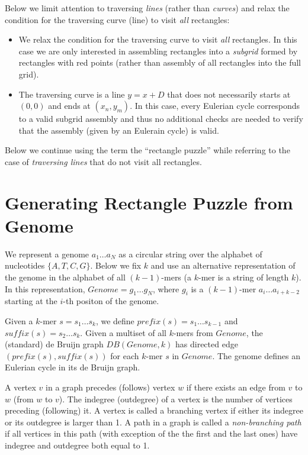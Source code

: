 \documentclass[a4paper]{article}
\begin{document}
Below we limit attention to traversing {\em lines} (rather than {\em curves})   and  relax the condition for the traversing curve (line) to visit  {\em all} rectangles: 
\begin{itemize} 
\item We relax the condition for the traversing curve to visit {\em all} rectangles.  In this case we are only interested in assembling  rectangles into a {\em subgrid}  formed by rectangles with red points (rather than assembly of all rectangles into the full grid). 
\item The traversing curve is a line $y=x+D$ that does not necessarily starts at $(0,0)$ and ends at $(x_n,y_m)$. In this case, every Eulerian cycle corresponds to a valid subgrid assembly and thus no additional checks are needed to verify that the assembly (given by an Eulerain cycle) is valid. 
\end{itemize}

Below we continue using the term the ``rectangle puzzle'' while referring to the case of \emph{traversing lines} that do not visit all rectangles. 

\section{Generating Rectangle Puzzle from Genome}


We represent a genome $a_1 \ldots a_N$ as a circular string over the alphabet of nucleotides $\{A,T,C,G\}$. 
Below we fix $k$ and use an alternative representation of the genome in the alphabet of all $(k-1)$-mers (a $k$-mer is a string of length $k$). In this representation,  $Genome=g_1 \ldots g_N$, where $g_i$ is a $(k-1)$-mer $a_i \ldots a_{i+k-2}$ starting at the $i$-th positon of the genome.  


Given a $k$-mer $s = s_1\ldots s_k$,
we define $prefix(s)= s_1\ldots s_{k-1}$ and $suffix(s) = s_2\ldots s_k$. Given a multiset of all $k$-mers  from $Genome$, 
the (standard) de Bruijn graph $DB(Genome,k)$ has directed edge $(prefix(s),suffix(s))$
for each $k$-mer $s$ in $Genome$.  The genome defines an Eulerian cycle in its de Bruijn graph. 

A vertex $v$  in a graph precedes (follows) vertex $w$ if there exists an edge from $v$ to $w$ (from $w$ to $v$). The indegree (outdegree)  of a vertex 
is the number of vertices preceding (following) it.  A vertex is called a branching vertex if either its indegree or its outdegree is larger than 1. A path in a graph is called a {\em non-branching path}  if all vertices in this path (with exception of the the first and the last ones) have indegree and outdegree
both equal to 1. 
\end{document}
